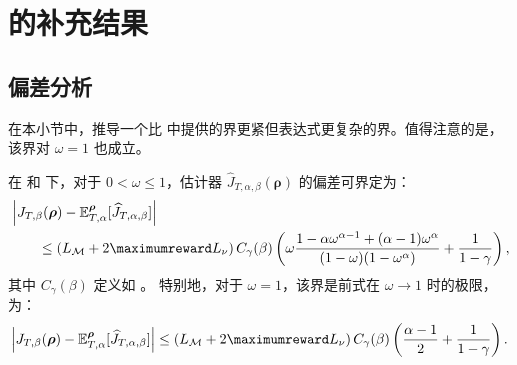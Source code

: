 \section{\texorpdfstring{}{} 的补充结果}

\subsection{偏差分析}

在本小节中，推导一个比  中提供的界更紧但表达式更复杂的界。值得注意的是，该界对 $\omega=1$ 也成立。

\begin{lemma}
\label{lem:bias_general}
在  和  下，对于 $0<\omega\leq1$，估计器 $\widehat{J}_{T,\alpha,\beta}(\boldsymbol\rho)$ 的偏差可界定为：
\begin{align*}
    &\left\vert J_{T,\beta}(\boldsymbol\rho) - \mathbb{E}^{\boldsymbol\rho}_{T,\alpha}[\widehat{J}_{T,\alpha,\beta}] \right\vert
    \\
    &\qquad \le\left(L_{\mathcal{M}} + 2\maximumreward L_\nu\right) C_{\gamma}(\beta) \left(\omega
    \frac{1-\alpha\omega^{\alpha-1} + (\alpha-1) \omega^\alpha}{(1-\omega)(1-\omega^\alpha)} + \frac{1}{1-\gamma}\right),
\end{align*}
其中 $C_\gamma(\beta)$ 定义如 。
特别地，对于 $\omega=1$，该界是前式在 $\omega \rightarrow 1$ 时的极限，为：
\begin{align*}
    \left|J_{T,\beta}(\boldsymbol\rho) - \mathbb{E}^{\boldsymbol\rho}_{T,\alpha}[\widehat{J}_{T,\alpha,\beta}] \right|\le \left(L_{\mathcal{M}} + 2\maximumreward L_\nu\right) C_{\gamma}(\beta) \left(\frac{\alpha-1}{2} + \frac{1}{1-\gamma}  \right).
\end{align*}
\end{lemma}
